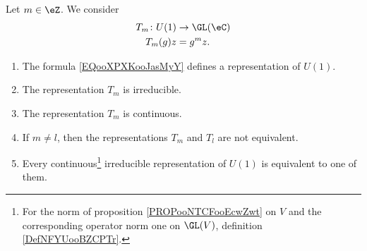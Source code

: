 \begin{proposition}       \label{PROPooLWWEooUmqbRA}
	Let \( m\in \eZ\). We consider
	\begin{equation}        \label{EQooXPXKooJasMyY}
		\begin{aligned}
			T_m\colon U(1) & \to \GL(\eC) \\
			T_m(g)z        & =g^mz.
		\end{aligned}
	\end{equation}
	\begin{enumerate}
		\item
		      The formula \eqref{EQooXPXKooJasMyY} defines a representation of \( U(1)\).
		\item
		      The representation \( T_m\) is irreducible.
		\item
		      The representation \( T_m\) is continuous.
		\item
		      If \( m\neq l\), then the representations \( T_m\) and \( T_l\) are not equivalent.
		\item       \label{ITEMooUPVQooQddQOJ}
		      Every continuous\footnote{For the norm of proposition \ref{PROPooNTCFooEcwZwt} on \( V\) and the corresponding operator norm one on \( \GL(V)\), definition \ref{DefNFYUooBZCPTr}.} irreducible representation of \( U(1)\) is equivalent to one of them.
	\end{enumerate}
\end{proposition}

